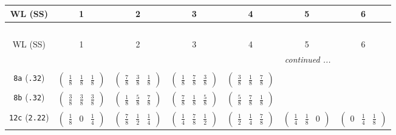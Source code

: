\documentclass[fleqn,9pt,landscape]{jsarticle}
\begin{document}
\begin{center}
\renewcommand{\arraystretch}{1.2}
\begin{longtable}{ccccccc}
 \hline \hline
WL (SS) & 1 & 2 & 3 & 4 & 5 & 6 \\ \hline \endfirsthead

\multicolumn{6}{l}{\tablename\ \thetable{}} \\
 \hline \hline
WL (SS) & 1 & 2 & 3 & 4 & 5 & 6 \\ \hline \endhead

 \hline \hline
\multicolumn{6}{r}{\footnotesize\it continued ...} \\ \endfoot

 \hline \hline
\multicolumn{6}{r}{} \\ \endlastfoot

{\tt 8a} ({\tt .32}) & $ \begin{pmatrix} \frac{1}{8} & \frac{1}{8} & \frac{1}{8} \end{pmatrix} $ & $ \begin{pmatrix} \frac{7}{8} & \frac{3}{8} & \frac{1}{8} \end{pmatrix} $ & $ \begin{pmatrix} \frac{1}{8} & \frac{7}{8} & \frac{3}{8} \end{pmatrix} $ & $ \begin{pmatrix} \frac{3}{8} & \frac{1}{8} & \frac{7}{8} \end{pmatrix} $ & $  $ & $  $ \\ \hline
{\tt 8b} ({\tt .32}) & $ \begin{pmatrix} \frac{3}{8} & \frac{3}{8} & \frac{3}{8} \end{pmatrix} $ & $ \begin{pmatrix} \frac{1}{8} & \frac{5}{8} & \frac{7}{8} \end{pmatrix} $ & $ \begin{pmatrix} \frac{7}{8} & \frac{1}{8} & \frac{5}{8} \end{pmatrix} $ & $ \begin{pmatrix} \frac{5}{8} & \frac{7}{8} & \frac{1}{8} \end{pmatrix} $ & $  $ & $  $ \\ \hline
{\tt 12c} ({\tt 2.22}) & $ \begin{pmatrix} \frac{1}{8} & 0 & \frac{1}{4} \end{pmatrix} $ & $ \begin{pmatrix} \frac{7}{8} & \frac{1}{2} & \frac{1}{4} \end{pmatrix} $ & $ \begin{pmatrix} \frac{1}{4} & \frac{7}{8} & \frac{1}{2} \end{pmatrix} $ & $ \begin{pmatrix} \frac{1}{2} & \frac{1}{4} & \frac{7}{8} \end{pmatrix} $ & $ \begin{pmatrix} \frac{1}{4} & \frac{1}{8} & 0 \end{pmatrix} $ & $ \begin{pmatrix} 0 & \frac{1}{4} & \frac{1}{8} \end{pmatrix} $ \\ \hline

\end{longtable}
\end{center}
\end{document}

